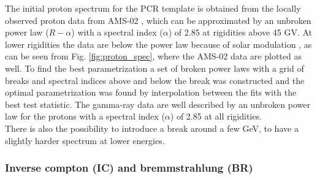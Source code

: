 The initial proton spectrum for the PCR template is obtained from the locally observed proton data from AMS-02 , which can be approximated by an unbroken power law ($R-\alpha$) with a spectral index ($\alpha$) of 2.85 at rigidities above 45 GV. At lower rigidities the data are below the power law because of solar modulation , as can be seen from Fig. \ref{fig:proton_spec}, where the AMS-02 data are plotted as well. To find the best parametrization a set of broken power laws with a grid of breaks and spectral indices above and below the break was constructed and the optimal parametrization was found by interpolation between the fits with the best test statistic. The gamma-ray data are well described by an unbroken power law for the protons with a spectral index ($\alpha$) of 2.85 at all rigidities.\\

There is also the possibility to introduce a break around a few GeV, to have a slightly harder spectrum at lower energies.\\


\subsubsection{Inverse compton (IC) and bremmstrahlung (BR)}

